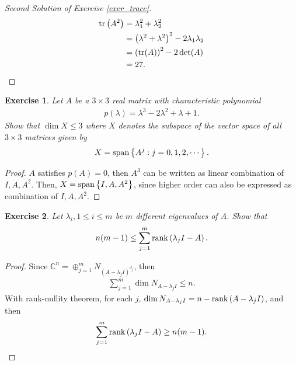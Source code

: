 \documentclass[11pt]{book}
\newtheorem{exercise}{Exercise}[section]
\theoremstyle{definition}
\numberwithin{equation}{chapter}
\begin{document}
\medskip

\begin{proof}[Second Solution of Exercise \ref{exer_trace}]
\begin{align*}
    {\rm tr}\left(A^2 \right) & = \lambda_1^2 + \lambda_2^2 \\
    & = \left(\lambda^2 + \lambda^2\right)^2 - 2 \lambda_1 \lambda_2 \\
    & = \left( {\rm tr}(A)\right)^2 - 2 \det (A) \\
    & = 27.
\end{align*}
\end{proof}

\medskip

\begin{exercise}
Let $A$ be a $3 \times 3$ real matrix with characteristic polynomial
\begin{align*}
    p(\lambda) = \lambda^3 - 2 \lambda^2 + \lambda + 1.
\end{align*}
Show that $\dim X \leq 3$ where $X$ denotes the subspace of the vector space of all $3 \times 3$ matrices given by 
\begin{align*}
    X = {\rm span} \left\{A^j: j = 0,1,2,\cdots\right\}.
\end{align*}
\end{exercise}
\begin{proof}
$A$ satisfies $p(A) = 0$, then $A^3$ can be written as linear combination of $I, A, A^2$. Then, $X = {\rm span} \left\{I, A, A^2\right\}$, since higher order can also be expressed as combination of $I, A, A^2$.
\end{proof}

\medskip

\begin{exercise}
Let $\lambda_i, 1 \leq i \leq m$ be $m$ different eigenvalues of $A$. Show that
\begin{align*}
    n(m - 1) \leq \sum^m_{j=1} \rank \left(\lambda_j I - A\right).
\end{align*}
\end{exercise}
\begin{proof}
Since $\mathbb{C}^n = \oplus^m_{j=1} N_{\left(A - \lambda_j I\right)^{d_j}}$, then 
\begin{align*}
    \sum^m_{j=1} \dim N_{A - \lambda_j I} \leq n.
\end{align*}
With rank-nullity theorem, for each $j$, $\dim N_{A - \lambda_j I} = n - \rank \left(A - \lambda_j I\right)$, and then
\begin{align*}
    \sum^m_{j=1} \rank \left(\lambda_j I - A\right) \geq n(m - 1).
\end{align*}
\end{proof}
\end{document}
